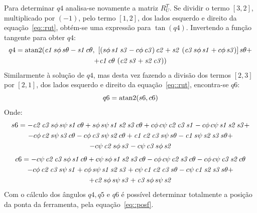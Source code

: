Para determinar $q4$ analisa-se novamente a matriz $R_{U}^{T}$. Se dividir o
termo $[3,2]$,  multiplicado por $(-1)$, pelo termo $[1,2]$, dos lados esquerdo
e direito da equação~\ref{eq::rut}, obtém-se uma expressão para $\tan(q4)$.
Invertendo a função tangente para obter $q4$:
\begin{multline} 
q4 = \operatorname{atan2}( {{\it c1}\,s\phi \,s\theta -{\it s1}\,c\theta} , ~
 \left[  \left( s\phi \,{\it s1}\,{\it s3}-c\phi \,{\it c3} \right) {
\it c2}+{\it s2}\, \left( {\it c3}\,s\phi \,{\it s1}+c\phi \,{\it s3}
 \right)  \right] s\theta +
 \\ +{\it c1}\,c\theta \, \left( {\it c2}\,{\it 
s3}+{\it s2}\,{\it c3} \right) 
 )
\end{multline}
%
Similarmente à solução de $q4$, mas desta vez fazendo a divisão dos termos
$[2,3]$ por $[2,1]$, dos lados esquerdo e direito da equação~\ref{eq::rut},
encontra-se $q6$:
%
\begin{equation} \label{eq::q6ik}
	q6 = \operatorname{atan2} ( {s6} , {c6} )
\end{equation}
%
Onde:
%
\begin{multline*}
	s6 = -{\it c2}\,{\it c3}\,s\phi \,s\psi \,{\it s1}\,c\theta +s\phi \,s\psi 
		\,{\it s1}\,{\it s2}\,{\it s3}\,c\theta +c\phi \,c\psi \,{\it c2}\,{
		\it c3}\,{\it s1}-c\phi \,c\psi \,{\it s1}\,{\it s2}\,{\it s3} +
		\\ -c\phi \,{\it c2}\,s\psi \,{\it s3}\,c\theta -c\phi \,{\it c3}\,s\psi \,{\it 
		s2}\,c\theta +{\it c1}\,{\it c2}\,{\it c3}\,s\psi \,s\theta -{\it c1}
		\,s\psi \,{\it s2}\,{\it s3}\,s\theta +
		\\ -c\psi \,{\it c2}\,s\phi \,{\it s3}-c\psi \,{\it c3}\,s\phi \,{\it s2}
\end{multline*}
\vspace{-15mm}
\begin{multline*}
	c6 = -c\psi \,{\it c2}\,{\it c3}\,s\phi \,{\it s1}\,c\theta +c\psi \,s\phi 
		\,{\it s1}\,{\it s2}\,{\it s3}\,c\theta -c\phi \,c\psi \,{\it c2}\,{
		\it s3}\,c\theta -c\phi \,c\psi \,{\it c3}\,{\it s2}\,c\theta 
		\\ -c\phi \,{\it c2}\,{\it c3}\,s\psi \,{\it s1}+c\phi \,s\psi \,{\it s1}\,{\it 
		s2}\,{\it s3}+c\psi \,{\it c1}\,{\it c2}\,{\it c3}\,s\theta -c\psi \,{
		\it c1}\,{\it s2}\,{\it s3}\,s\theta +
		\\ +{\it c2}\,s\phi \,s\psi \,{\it s3}+{\it c3}\,s\phi \,s\psi \,{\it s2}
\end{multline*}
%
Com o cálculo dos ângulos $q4, q5$ e $q6$ é possível determinar totalmente a
posição da ponta da ferramenta, pela equação~\ref{eq::posf}.

